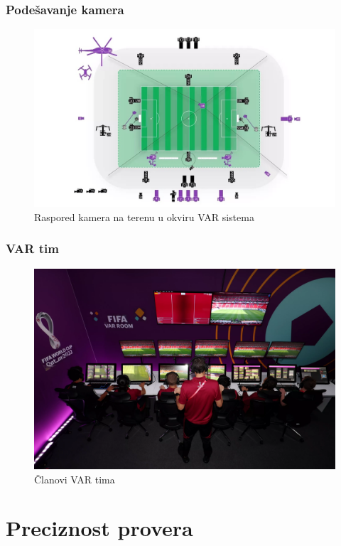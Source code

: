 \documentclass{beamer}
\begin{document}
\begin{frame}
  \frametitle{Podešavanje kamera}
    \begin{figure}[h!]
    \begin{center}
    \includegraphics[scale=0.30]{Var sistem.jpeg}
    \end{center}
    \caption{Raspored kamera na terenu u okviru VAR sistema}
    \label{fig:kamere}
\end{figure}
\end{frame}
\begin{frame}
  \frametitle{VAR tim}
    \begin{figure}[h!]
    \begin{center}
    \includegraphics[scale=0.20]{var.png}
    \end{center}
    \caption{Članovi VAR tima}
    \label{fig:vartim}
\end{figure}
\end{frame}

\section{Preciznost provera}
\end{document}
